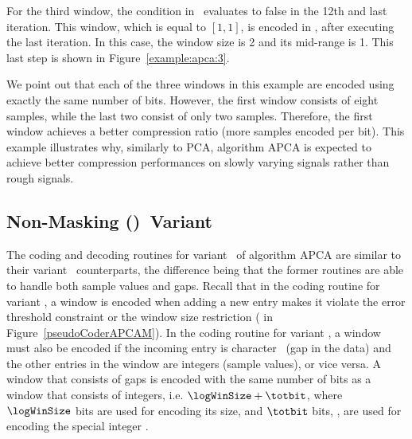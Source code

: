 For the third window, the condition in \Line \APCACodeOne\ evaluates to false in the 12th and last iteration. This window, which is equal to $[1, 1]$, is encoded in \Line \APCACodeTwo, after executing the last iteration. In this case, the window size is 2 and its mid-range is 1. This last step is shown in Figure~\ref{example:apca:3}.


\vspace{+5pt}


We point out that each of the three windows in this example are encoded using exactly the same number of bits. However, the first window consists of eight samples, while the last two consist of only two samples. Therefore, the first window achieves a better compression ratio (more samples encoded per bit). This example illustrates why, similarly to PCA, algorithm APCA is expected to achieve better compression performances on slowly varying signals rather than rough signals.




\clearpage
\subsection{Non-Masking (\NOmaskalgo)\ Variant}
\label{algo:apca:nmvariant}


The coding and decoding routines for variant \NOmaskalgo\ of algorithm APCA are similar to their variant \maskalgo\ counterparts, the difference being that the former routines are able to handle both sample values and gaps. Recall that in the coding routine for variant \maskalgo, a window is encoded when adding a new entry makes it violate the error threshold constraint or the window size restriction ( in Figure~\ref{pseudoCoderAPCAM}). In the coding routine for variant \NOmaskalgo, a window must also be encoded if the incoming entry is character \noData\ (gap in the data) and the other entries in the window are integers (sample values), or vice versa. A window that consists of gaps is encoded with the same number of bits as a window that consists of integers, i.e. $\logWinSize+\totbit$, where $\logWinSize$ bits are used for encoding its size, and $\totbit$ bits, \wheretotbit, are used for encoding the special integer \nodata.


